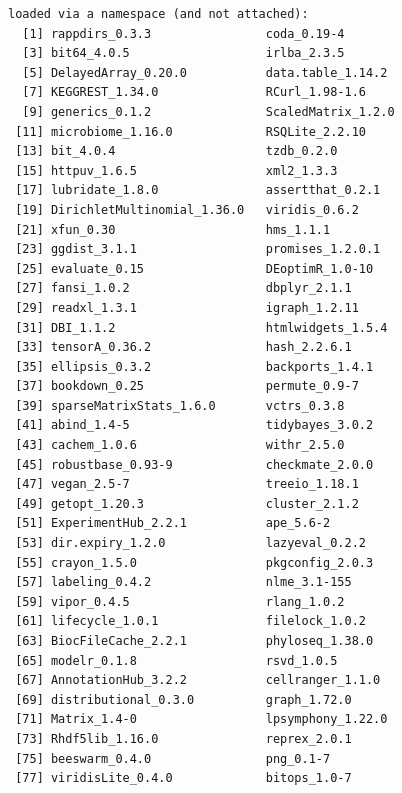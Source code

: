 \documentclass[
]{book}
\begin{document}
\begin{verbatim}
loaded via a namespace (and not attached):
  [1] rappdirs_0.3.3                coda_0.19-4                  
  [3] bit64_4.0.5                   irlba_2.3.5                  
  [5] DelayedArray_0.20.0           data.table_1.14.2            
  [7] KEGGREST_1.34.0               RCurl_1.98-1.6               
  [9] generics_0.1.2                ScaledMatrix_1.2.0           
 [11] microbiome_1.16.0             RSQLite_2.2.10               
 [13] bit_4.0.4                     tzdb_0.2.0                   
 [15] httpuv_1.6.5                  xml2_1.3.3                   
 [17] lubridate_1.8.0               assertthat_0.2.1             
 [19] DirichletMultinomial_1.36.0   viridis_0.6.2                
 [21] xfun_0.30                     hms_1.1.1                    
 [23] ggdist_3.1.1                  promises_1.2.0.1             
 [25] evaluate_0.15                 DEoptimR_1.0-10              
 [27] fansi_1.0.2                   dbplyr_2.1.1                 
 [29] readxl_1.3.1                  igraph_1.2.11                
 [31] DBI_1.1.2                     htmlwidgets_1.5.4            
 [33] tensorA_0.36.2                hash_2.2.6.1                 
 [35] ellipsis_0.3.2                backports_1.4.1              
 [37] bookdown_0.25                 permute_0.9-7                
 [39] sparseMatrixStats_1.6.0       vctrs_0.3.8                  
 [41] abind_1.4-5                   tidybayes_3.0.2              
 [43] cachem_1.0.6                  withr_2.5.0                  
 [45] robustbase_0.93-9             checkmate_2.0.0              
 [47] vegan_2.5-7                   treeio_1.18.1                
 [49] getopt_1.20.3                 cluster_2.1.2                
 [51] ExperimentHub_2.2.1           ape_5.6-2                    
 [53] dir.expiry_1.2.0              lazyeval_0.2.2               
 [55] crayon_1.5.0                  pkgconfig_2.0.3              
 [57] labeling_0.4.2                nlme_3.1-155                 
 [59] vipor_0.4.5                   rlang_1.0.2                  
 [61] lifecycle_1.0.1               filelock_1.0.2               
 [63] BiocFileCache_2.2.1           phyloseq_1.38.0              
 [65] modelr_0.1.8                  rsvd_1.0.5                   
 [67] AnnotationHub_3.2.2           cellranger_1.1.0             
 [69] distributional_0.3.0          graph_1.72.0                 
 [71] Matrix_1.4-0                  lpsymphony_1.22.0            
 [73] Rhdf5lib_1.16.0               reprex_2.0.1                 
 [75] beeswarm_0.4.0                png_0.1-7                    
 [77] viridisLite_0.4.0             bitops_1.0-7                 

\end{verbatim}
\end{document}

